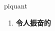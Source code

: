 
\begin{frame}
{\huge piquant}
\begin{center}
\begin{enumerate}\Large
  \item \textbf{令人振奋的}
\end{enumerate}
\end{center}
\end{frame}
